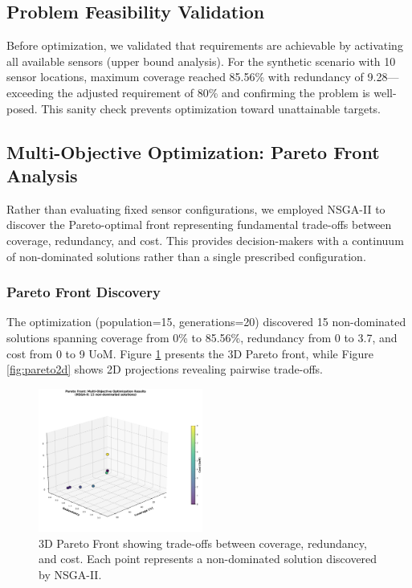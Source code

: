\subsection{Problem Feasibility Validation}

Before optimization, we validated that requirements are achievable by activating all available sensors (upper bound analysis). For the synthetic scenario with 10 sensor locations, maximum coverage reached 85.56\% with redundancy of 9.28—exceeding the adjusted requirement of 80\% and confirming the problem is well-posed. This sanity check prevents optimization toward unattainable targets.

\subsection{Multi-Objective Optimization: Pareto Front Analysis}

Rather than evaluating fixed sensor configurations, we employed NSGA-II to discover the Pareto-optimal front representing fundamental trade-offs between coverage, redundancy, and cost. This provides decision-makers with a continuum of non-dominated solutions rather than a single prescribed configuration.

\subsubsection{Pareto Front Discovery}

The optimization (population=15, generations=20) discovered 15 non-dominated solutions spanning coverage from 0\% to 85.56\%, redundancy from 0 to 3.7, and cost from 0 to 9 UoM. Figure \ref{fig:pareto3d} presents the 3D Pareto front, while Figure \ref{fig:pareto2d} shows 2D projections revealing pairwise trade-offs.

\begin{figure}[t]
  \centering
  \includegraphics[width=0.48\textwidth]{figures/pareto_front_3d.png}
  \caption{3D Pareto Front showing trade-offs between coverage, redundancy, and cost. Each point represents a non-dominated solution discovered by NSGA-II.}
  \label{fig:pareto3d}
\end{figure}

